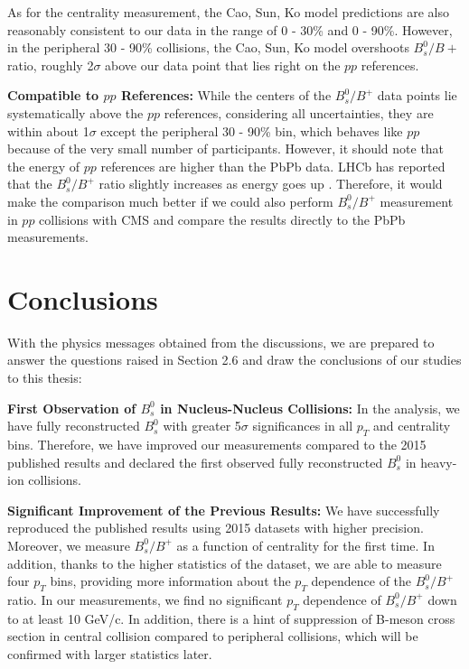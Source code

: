 As for the centrality measurement, the Cao, Sun, Ko model predictions are also reasonably consistent to our data in the range of 0 - 30\% and 0 - 90\%. However, in the peripheral 30 - 90\% collisions, the Cao, Sun, Ko model overshoots $B^0_s/B+$ ratio, roughly 2$\sigma$ above our data point that lies right on the $pp$ references.  


\textbf{Compatible to $pp$ References:} While the centers of the $B^0_s/B^+$ data points lie systematically above the $pp$ references, considering all uncertainties, they are within about 1$\sigma$ except the peripheral 30 - 90\% bin, which behaves like $pp$ because of the very small number of participants. However, it should note that the energy of $pp$ references are higher than the PbPb data. LHCb has reported that the $B^0_s/B^+$ ratio slightly increases as energy goes up \cite{LHCbFF}. Therefore, it would make the comparison much better if we could also perform $B^0_s/B^+$ measurement in $pp$ collisions with CMS and compare the results directly to the PbPb measurements.



\section{Conclusions}


With the physics messages obtained from the discussions, we are prepared to answer the questions raised in Section 2.6 and draw the conclusions of our studies to this thesis:



\textbf{First Observation of $B^0_s$ in Nucleus-Nucleus Collisions:} In the analysis, we have fully reconstructed $B^0_s$ with greater 5$\sigma$ significances in all $p_T$ and centrality bins. Therefore, we have improved our measurements compared to the 2015 published results and declared the first observed fully reconstructed $B^0_s$ in heavy-ion collisions.

\textbf{Significant Improvement of the Previous Results:} We have successfully reproduced the published results using 2015 datasets with higher precision. Moreover, we measure $B^0_s/B^+$ as a function of centrality for the first time. In addition, thanks to the higher statistics of the dataset, we are able to measure four $p_T$ bins, providing more information about the $p_T$ dependence of the $B^0_s/B^+$ ratio. In our measurements, we find no significant $p_T$ dependence of $B^0_s/B^+$ down to at least 10 GeV/c. In addition, there is a hint of suppression of B-meson cross section in central collision compared to peripheral collisions, which will be confirmed with larger statistics later. 
 
